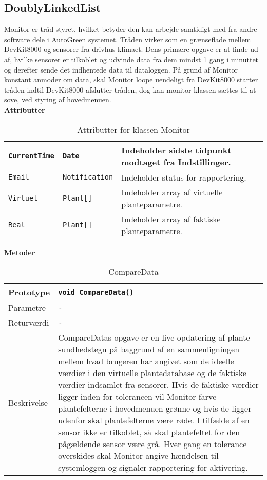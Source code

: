 \subsection{DoublyLinkedList}

Monitor er tråd styret, hvilket betyder den kan arbejde samtidigt med fra andre software dele i AutoGreen systemet. Tråden virker som en grænseflade mellem DevKit8000 og sensorer fra drivhus klimaet. 
Dens primære opgave er at finde ud af, hvilke sensorer er tilkoblet og udvinde data fra dem mindst 1 gang i minuttet og derefter sende det indhentede data til dataloggen.
På grund af Monitor konstant anmoder om data, skal Monitor loope uendeligt fra DevKit8000 starter tråden indtil DevKit8000 afslutter tråden, dog kan monitor klassen sættes til at sove, ved styring af hovedmenuen.\\


\textbf{Attributter}

\begin{table}[h]
\begin{tabularx}{\textwidth}{| >{\raggedright\arraybackslash}X | >{\raggedright\arraybackslash}X | >{\raggedright\arraybackslash}p{10 cm} |} \hline
\texttt{CurrentTime} & \texttt{Date} & Indeholder sidste tidpunkt modtaget fra Indstillinger. \\\hline
\texttt{Email} & \texttt{Notification} & Indeholder status for rapportering. \\\hline
\texttt{Virtuel} & \texttt{Plant[]} & Indeholder array af virtuelle planteparametre. \\\hline
\texttt{Real} & \texttt{Plant[]} & Indeholder array af faktiske planteparametre. \\\hline
\end{tabularx}
\caption{Attributter for klassen Monitor}
\label{table:Monitor_attributter}
\end{table}

\textbf{Metoder}

\begin{table}[h]
\begin{tabularx}{\textwidth}{| >{\raggedright\arraybackslash}p{2.5 cm} | >{\raggedright\arraybackslash}X |} \hline
Prototype & \texttt{void CompareData()} \\\hline
Parametre & \texttt{-} \\\hline
Returværdi & \texttt{-} \\\hline
Beskrivelse & CompareDatas opgave er en live opdatering af plante sundhedstegn på baggrund af en sammenligningen mellem hvad brugeren har angivet som de ideelle værdier i den virtuelle plantedatabase og de faktiske værdier indsamlet fra sensorer. Hvis de faktiske værdier ligger inden for tolerancen vil Monitor farve plantefelterne i hovedmenuen grønne og hvis de ligger udenfor skal plantefelterne være røde. I tilfælde af en sensor ikke er tilkoblet, så skal plantefeltet for den pågældende sensor være grå.
Hver gang en tolerance overskides skal Monitor angive hændelsen til systemloggen og signaler rapportering for aktivering.
 \\\hline
\end{tabularx}
\caption{CompareData}
\label{table:CompareData}
\end{table}
